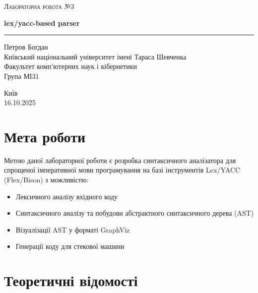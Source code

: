 \documentclass[12pt,a4paper]{article}
\begin{document}
\begin{titlepage}
    \centering
    
    \textsc{Лабораторна робота №3}
    
    
    {\Large\bfseries lex/yacc-based parser\\}
    \rule{3in}{0.4pt}
    
    
    Петров Богдан\\
    Київський національний університет імені Тараса Шевченка\\
    Факультет комп'ютерних наук і кібернетики\\
    Група МІ31\\
    
    
    {\small
    Київ\\
    16.10.2025}
    
    
    \end{titlepage}
    
    \newpage
    
    \tableofcontents
    
    \newpage

\section{Мета роботи}

Метою даної лабораторної роботи є розробка синтаксичного аналізатора для спрощеної імперативної мови програмування на базі інструментів Lex/YACC (Flex/Bison) з можливістю:

\begin{itemize}
    \item Лексичного аналізу вхідного коду
    \item Синтаксичного аналізу та побудови абстрактного синтаксичного дерева (AST)
    \item Візуалізації AST у форматі GraphViz
    \item Генерації коду для стекової машини
\end{itemize}

\section{Теоретичні відомості}
\end{document}
